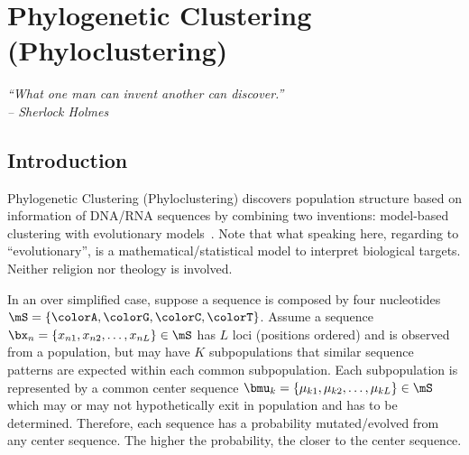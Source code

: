 
\chapter{Phylogenetic Clustering (Phyloclustering)}
\label{chp:phyloclustering}


{\it
``What one man can invent another can discover.''\\
\--- Sherlock Holmes
}


\section{Introduction}

Phylogenetic Clustering (Phyloclustering)
discovers population structure based on information of DNA/RNA sequences
by combining two inventions: model-based clustering with evolutionary
models~\citep{Chen2011a}.
Note that what speaking here, regarding to ``evolutionary'',
is a mathematical/statistical model to interpret biological targets.
Neither religion nor theology is involved. 

In an over simplified case, suppose a sequence is composed by four nucleotides
$\mS = \{\colorA, \colorG, \colorC, \colorT\}$.
Assume a sequence
$\bx_n = \{x_{n1}, x_{n2},\ldots, x_{nL}\} \in \mS$
has $L$ loci (positions ordered) and is observed from a population, but
may have $K$ subpopulations that similar sequence patterns are expected
within each common subpopulation.
Each subpopulation is represented by a common center sequence
$\bmu_k = \{\mu_{k1}, \mu_{k2},\ldots, \mu_{kL}\} \in \mS$
which may or may not hypothetically exit in population and has to be
determined.
Therefore, each sequence has a probability mutated/evolved from any
center sequence. The higher the probability, the closer to the center
sequence.

